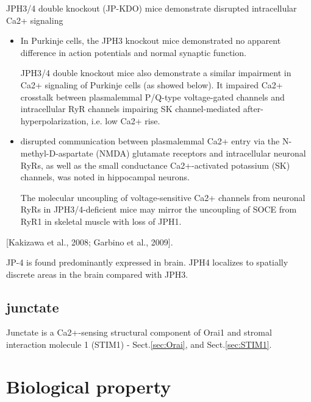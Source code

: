 JPH3/4 double knockout (JP-KDO) mice demonstrate disrupted intracellular Ca2+
signaling
\begin{itemize}
  
  \item   In Purkinje cells,  the JPH3 knockout mice demonstrated no apparent
  difference in action potentials and normal synaptic function.

JPH3/4 double knockout mice also demonstrate a similar impairment in Ca2+
signaling of Purkinje cells (as showed below).
It impaired Ca2+ crosstalk between plasmalemmal P/Q-type voltage-gated channels
and intracellular RyR channels impairing SK channel-mediated
after-hyperpolarization, i.e. low Ca2+ rise.

  \item disrupted communication between plasmalemmal Ca2+ entry via the
  N-methyl-D-aspartate (NMDA) glutamate receptors and intracellular neuronal
  RyRs, as well as the small conductance Ca2+-activated potassium (SK) channels,
  was noted in hippocampal neurons.

The molecular uncoupling of voltage-sensitive Ca2+ channels from neuronal RyRs
in JPH3/4-deficient mice may mirror the uncoupling of SOCE from RyR1 in skeletal
muscle with loss of JPH1.

\end{itemize}

[Kakizawa et al., 2008;
Garbino et al., 2009].


JP-4 is found predominantly expressed in brain.
JPH4 localizes to spatially discrete areas in the brain compared with JPH3.


\subsection{junctate}
\label{sec:junctate}

Junctate is a Ca2+-sensing structural component of Orai1 and stromal interaction
molecule 1 (STIM1) - Sect.\ref{sec:Orai}, and Sect.\ref{sec:STIM1}.


\section{Biological property}
\label{sec:biol-funct-membr}

